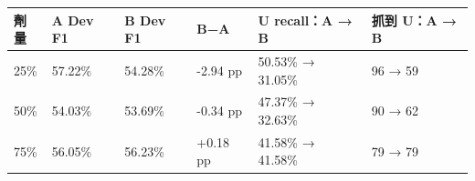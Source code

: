 \begin{tabular}{llllll}
\toprule
劑量 & A Dev F1 & B Dev F1 & B−A & U recall：A → B & 抓到 U：A → B\\
\midrule
25\% & 57.22\% & 54.28\% & -2.94 pp & 50.53\% → 31.05\% & 96 → 59\\
50\% & 54.03\% & 53.69\% & -0.34 pp & 47.37\% → 32.63\% & 90 → 62\\
75\% & 56.05\% & 56.23\% & +0.18 pp & 41.58\% → 41.58\% & 79 → 79\\
\bottomrule
\end{tabular}
